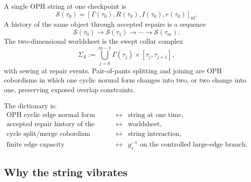 \documentclass[11pt]{article}
\theoremstyle{remark}
\theoremstyle{plain}
\begin{document}
A single OPH string at one checkpoint is
\[
\mathcal S(\tau_0)=[\Gamma(\tau_0),R(\tau_0),I(\tau_0),r(\tau_0)]_{\mathrm{nf}}.
\]
A history of the same object through accepted repairs is a sequence
\[
\mathcal S(\tau_0)\to \mathcal S(\tau_1)\to\cdots\to\mathcal S(\tau_m).
\]
The two-dimensional worldsheet is the swept collar complex
\[
\Sigma_{\mathcal S}:=\bigcup_{j=0}^{m-1}\Gamma(\tau_j)\times[\tau_j,\tau_{j+1}],
\]
with sewing at repair events. Pair-of-pants splitting and joining are OPH cobordisms in which one
cyclic normal form changes into two, or two change into one, preserving exposed overlap
constraints.

The dictionary is:
\[
\begin{array}{ccl}
\text{OPH cyclic edge normal form} &\longleftrightarrow& \text{string at one time},\\
\text{accepted repair history of the cycle} &\longleftrightarrow& \text{worldsheet},\\
\text{cycle split/merge cobordism} &\longleftrightarrow& \text{string interaction},\\
\text{finite edge capacity} &\longleftrightarrow& g_s^{-1}\text{ on the controlled large-edge branch}.
\end{array}
\]

\subsection{Why the string vibrates}
\end{document}
